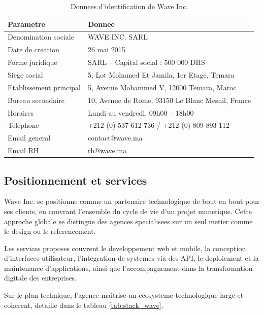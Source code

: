 \documentclass[12pt, a4paper]{report}
\begin{document}
\vspace{0.4cm}
\begin{table}[H]
\centering
\caption{Donnees d'identification de Wave Inc.}
\label{tab:identite_wave}
\begin{tabularx}{\textwidth}{@{}lX@{}}
\toprule
\textbf{Parametre} & \textbf{Donnee} \\
\midrule
Denomination sociale     & WAVE INC. SARL \\
Date de creation         & 26 mai 2015 \\
Forme juridique          & SARL -- Capital social : 500 000 DHS \\
Siege social             & 5, Lot Mohamed Et Jamila, 1er Etage, Temara \\
Etablissement principal  & 5, Avenue Mohammed V, 12000 Temara, Maroc \\
Bureau secondaire        & 10, Avenue de Rome, 93150 Le Blanc Mesnil, France \\
Horaires                 & Lundi au vendredi, 09h00 -- 18h00 \\
Telephone                & +212 (0) 537 612 736 / +212 (0) 809 893 112 \\
Email general            & contact@wave.ma \\
Email RH                 & rh@wave.ma \\
\bottomrule
\end{tabularx}
\end{table}

\subsection{Positionnement et services}

Wave Inc. se positionne comme un partenaire technologique de bout en bout pour
ses clients, en couvrant l'ensemble du cycle de vie d'un projet numerique. Cette
approche globale se distingue des agences specialisees sur un seul metier comme
le design ou le referencement.

Les services proposes couvrent le developpement web et mobile, la conception
d'interfaces utilisateur, l'integration de systemes via des API, le deploiement
et la maintenance d'applications, ainsi que l'accompagnement dans la
transformation digitale des entreprises.

Sur le plan technique, l'agence maitrise un ecosysteme technologique large et
coherent, detaille dans le tableau \ref{tab:stack_wave}.
\end{document}
